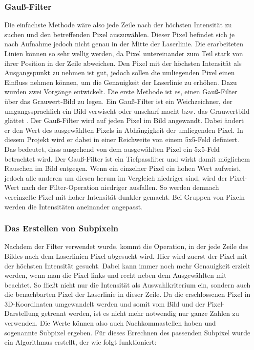 	\subsubsection{Gauß-Filter}
	Die einfachste Methode wäre also jede Zeile nach der höchsten Intensität zu suchen und den betreffenden Pixel auszuwählen. Dieser Pixel befindet sich je nach Aufnahme jedoch nicht genau in der Mitte der Laserlinie. Die erarbeiteten Linien können so sehr \glqq wellig\grqq{} werden, da Pixel untereinander zum Teil stark von ihrer Position in der Zeile abweichen. Den Pixel mit der höchsten Intensität als Ausgangspunkt zu nehmen ist gut, jedoch sollen die umliegenden Pixel einen Einfluss nehmen können, um die Genauigkeit der Laserlinie zu erhöhen. Dazu wurden zwei Vorgänge entwickelt. \newline
	Die erste Methode ist es, einen Gauß-Filter über das Grauwert-Bild zu legen. Ein Gauß-Filter ist ein Weichzeichner, der umgangssprachlich ein Bild verwischt oder unscharf macht bzw. das Grauwertbild glättet \citep[vgl.][S. 134ff]{nischwitz_bildverarbeitung_2020}. Der Gauß-Filter wird auf jeden Pixel im Bild angewandt. Dabei ändert er den Wert des ausgewählten Pixels in Abhängigkeit der umliegenden Pixel. In diesem Projekt wird er dabei in einer Reichweite von einem 5x5-Feld definiert. Das bedeutet, dass ausgehend von dem ausgewählten Pixel ein 5x5-Feld betrachtet wird. Der Gauß-Filter ist ein Tiefpassfilter und wirkt damit möglichem Rauschen im Bild entgegen. Wenn ein einzelner Pixel ein hohen Wert aufweist, jedoch alle anderen um diesen herum im Vergleich niedriger sind, wird der Pixel-Wert nach der Filter-Operation niedriger ausfallen. So werden demnach vereinzelte Pixel mit hoher Intensität dunkler gemacht. Bei Gruppen von Pixeln werden die Intensitäten aneinander angepasst.
	
	\subsubsection{Das Erstellen von Subpixeln}
	Nachdem der Filter verwendet wurde, kommt die Operation, in der jede Zeile des Bildes nach dem Laserlinien-Pixel abgesucht wird. Hier wird zuerst der Pixel mit der höchsten Intensität gesucht. Dabei kann immer noch mehr  Genauigkeit erzielt werden, wenn man die Pixel links und recht neben dem Ausgewählten mit beachtet. So fließt nicht nur die Intensität als Auswahlkriterium ein, sondern auch die benachbarten Pixel der Laserlinie in dieser Zeile. Da die erschlossenen Pixel in 3D-Koordinaten umgewandelt werden und somit vom Bild und der Pixel-Darstellung getrennt werden, ist es nicht mehr notwendig nur ganze Zahlen zu verwenden. Die Werte können also auch Nachkommastellen haben und sogenannte Subpixel ergeben. Für dieses Errechnen des passenden Subpixel wurde ein Algorithmus erstellt, der wie folgt funktioniert:
	
